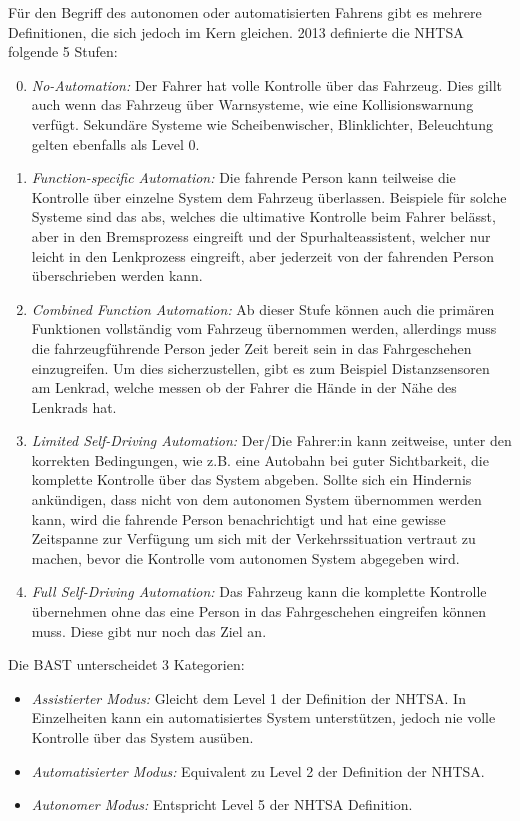 \documentclass[conference,compsoc,final,a4paper]{IEEEtran}
\begin{document}
Für den Begriff des autonomen oder automatisierten Fahrens gibt es mehrere Definitionen, die sich jedoch im Kern gleichen.
2013 definierte die \ac{NHTSA} folgende 5 Stufen\cite{NHTSA2013}:
\begin{enumerate}
  \setcounter{enumi}{-1}
  \item \emph{No-Automation:} Der Fahrer hat volle Kontrolle über das Fahrzeug. Dies gillt auch wenn das Fahrzeug über Warnsysteme, wie eine Kollisionswarnung verfügt. Sekundäre Systeme wie Scheibenwischer, Blinklichter, Beleuchtung gelten ebenfalls als Level 0.
  \item \emph{Function-specific Automation:} Die fahrende Person kann teilweise die Kontrolle über einzelne System dem Fahrzeug überlassen. Beispiele für solche Systeme sind das \ac{abs}, welches die ultimative Kontrolle beim Fahrer belässt, aber in den Bremsprozess eingreift und der Spurhalteassistent, welcher nur leicht in den Lenkprozess eingreift, aber jederzeit von der fahrenden Person überschrieben werden kann.
  \item \emph{Combined Function Automation:} Ab dieser Stufe können auch die primären Funktionen vollständig vom Fahrzeug übernommen werden, allerdings muss die fahrzeugführende Person jeder Zeit bereit sein in das Fahrgeschehen einzugreifen. Um dies sicherzustellen, gibt es zum Beispiel Distanzsensoren am Lenkrad, welche messen ob der Fahrer die Hände in der Nähe des Lenkrads hat. %
  \item \emph{Limited Self-Driving Automation:} Der/Die Fahrer:in kann zeitweise, unter den korrekten Bedingungen, wie z.B. eine Autobahn bei guter Sichtbarkeit, die komplette Kontrolle über das System abgeben. Sollte sich ein Hindernis ankündigen, dass nicht von dem autonomen System übernommen werden kann, wird die fahrende Person benachrichtigt und hat eine gewisse Zeitspanne zur Verfügung um sich mit der Verkehrssituation vertraut zu machen, bevor die Kontrolle vom autonomen System abgegeben wird.
  \item \emph{Full Self-Driving Automation:} Das Fahrzeug kann die komplette Kontrolle übernehmen ohne das eine Person in das Fahrgeschehen eingreifen können muss. Diese gibt nur noch das Ziel an.
\end{enumerate}

Die \ac{BAST} unterscheidet 3 Kategorien\cite{bast2021}:

\begin{itemize}
  \item \emph{Assistierter Modus:} Gleicht dem Level 1 der Definition der \ac{NHTSA}. In Einzelheiten kann ein automatisiertes System unterstützen, jedoch nie volle Kontrolle über das System ausüben.
  \item \emph{Automatisierter Modus:} Equivalent zu Level 2 der Definition der \ac{NHTSA}.
  \item \emph{Autonomer Modus:} Entspricht Level 5 der \ac{NHTSA} Definition.
\end{itemize}
\end{document}

